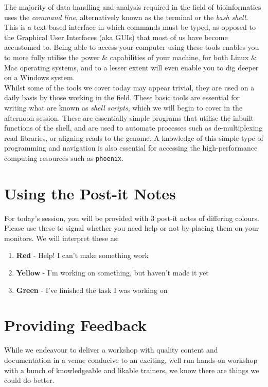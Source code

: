 The majority of data handling and analysis required in the field of bioinformatics uses the \textit{command line}, alternatively known as the terminal or the \textit{bash shell}.
This is a text-based interface in which commands must be typed, as opposed to the Graphical User Interfaces (aka GUIs) that most of us have become accustomed to.
Being able to access your computer using these tools enables you to more fully utilise the power \& capabilities of your machine, for both Linux \& Mac operating systems, and to a lesser extent will even enable you to dig deeper on a Windows system.\\

Whilst some of the tools we cover today may appear trivial, they are used on a daily basis by those working in the field.
These basic tools are essential for writing what are known as \textit{shell scripts}, which we will begin to cover in the afternoon session.
These are essentially simple programs that utilise the inbuilt functions of the shell, and are used to automate processes such as de-multiplexing read libraries, or aligning reads to the genome.
A knowledge of this simple type of programming and navigation is also essential for accessing the high-performance computing resources such as \texttt{phoenix}.\\

\section{Using the Post-it Notes}
For today's session, you will be provided with 3 post-it notes of differing colours.
Please use these to signal whether you need help or not by placing them on your monitors.
We will interpret these as:
\begin{enumerate}
	\item \textbf{Red} - Help! I can't make something work
	\item \textbf{Yellow} - I'm working on something, but haven't made it yet
	\item \textbf{Green} - I've finished the task I was working on
\end{enumerate}

\section{Providing Feedback}
While we endeavour to deliver a workshop with quality content and documentation in a venue conducive to an exciting, well run hands-on workshop with a bunch of knowledgeable and likable
trainers, we know there are things we could do better.

